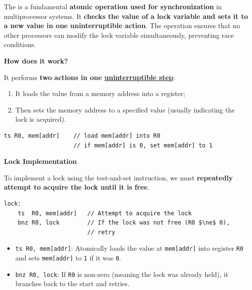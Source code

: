 
The  is a fundamental \textbf{atomic operation used for synchronization} in multiprocessor systems. It \textbf{checks the value of a lock variable and sets it to a new value in one uninterruptible action}. The operation ensures that no other processors can modify the lock variable simultaneously, preventing race conditions.

\highspace
\begin{flushleft}
    \textcolor{Green3}{ \textbf{How does it work?}}
\end{flushleft}
It performs \textbf{two actions in one \underline{uninterruptible step}}:
\begin{enumerate}
    \item It loads the value from a memory address into a register;
    \item Then sets the memory address to a specified value (usually indicating the lock is acquired).
\end{enumerate}
\begin{lstlisting}
ts R0, mem[addr]    // load mem[addr] into R0
                    // if mem[addr] is 0, set mem[addr] to 1
\end{lstlisting}

\highspace
\begin{flushleft}
    \textcolor{Green3}{ \textbf{Lock Implementation}}
\end{flushleft}
To implement a lock using the test-and-set instruction, we must \textbf{repeatedly attempt to acquire the lock until it is free}.
\begin{lstlisting}[mathescape=true]
lock:   
    ts  R0, mem[addr]   // Attempt to acquire the lock
    bnz R0, lock        // If the lock was not free (R0 $\ne$ 0),
                        // retry
\end{lstlisting}
\begin{itemize}
    \item \texttt{ts R0, mem[addr]}: Atomically loads the value at \texttt{mem[addr]} into register \texttt{R0} and sets \texttt{mem[addr]} to \texttt{1} if it was \texttt{0}.

    \item \texttt{bnz R0, lock}: If \texttt{R0} is non-zero (meaning the lock was already held), it branches back to the start and retries.
\end{itemize}

